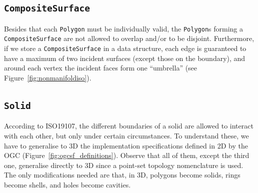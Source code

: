 \subsection{\texttt{CompositeSurface}}
Besides that each \texttt{Polygon} must be individually valid, the \texttt{Polygon}s forming a \texttt{Composite\-Surface} are not allowed to overlap and/or to be disjoint.
Furthermore, if we store a \texttt{Com\-po\-site\-Surface} in a data structure, each edge is guaranteed to have a maximum of two incident surfaces (except those on the boundary), and around each vertex the incident faces form one ``umbrella'' (see Figure~\ref{fig:nonmanifoldiso}).


\subsection{\texttt{Solid}}

According to ISO19107, the different boundaries of a solid are allowed to interact with each other, but only under certain circumstances.
To understand these, we have to generalise to 3D the implementation specifications defined in 2D by the OGC (Figure~\ref{fig:ogcsf_definitions}).
Observe that all of them, except the third one, generalise directly to 3D since a point-set topology nomenclature is used.
The only modifications needed are that, in 3D, polygons become solids, rings become shells, and holes become cavities.

